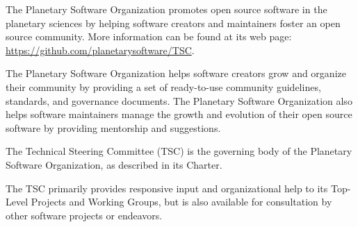 \documentclass[twoside]{article}
\begin{document}


%

%


The Planetary Software Organization promotes open source software
in the planetary sciences by helping software creators and maintainers
foster an open source community.  More information can be found at
its web page: \url{https://github.com/planetarysoftware/TSC}.

The Planetary Software Organization helps software creators grow
and organize their community by providing a set of ready-to-use
community guidelines, standards, and governance documents. The
Planetary Software Organization also helps software maintainers
manage the growth and evolution of their open source software by
providing mentorship and suggestions.

The Technical Steering Committee (TSC) is the governing body of the
Planetary Software Organization, as described in its Charter.

The TSC primarily provides responsive input and organizational help
to its Top-Level Projects and Working Groups, but is also available
for consultation by other software projects or endeavors.



\printbibliography

%
%

\end{document}

